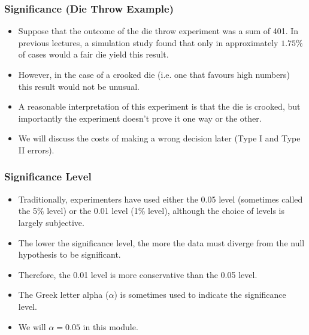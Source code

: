 ﻿\documentclass[a4]{beamer}
\begin{document}
\begin{frame}
\frametitle{Significance (Die Throw Example)}
\begin{itemize}
\item Suppose that the outcome of the die throw experiment was a sum of 401. In previous lectures, a simulation study found that only in approximately $1.75\%$ of cases would a fair die yield this result.
\item However, in the case of a crooked die (i.e. one that favours high numbers) this result would not be unusual.
\item A reasonable interpretation of this experiment is that the die is crooked, but importantly the experiment doesn't prove it one way or the other.
\item We will discuss the costs of making a wrong decision later (Type I and Type II errors).
\end{itemize}
\end{frame}
\begin{frame}
\frametitle{Significance Level}

\begin{itemize}
\item Traditionally, experimenters have used either the 0.05 level (sometimes called the 5\% level) or the 0.01 level (1\% level), although the choice of levels is largely subjective.  \item The lower the significance level, the more the data must diverge from the null hypothesis to be significant. \item Therefore, the 0.01 level is more conservative than the 0.05 level. \item The Greek letter alpha ($\alpha$) is sometimes used to indicate the significance level. \item We will $\alpha =0.05$ in this module. \end{itemize}
\end{frame}
\end{document}
